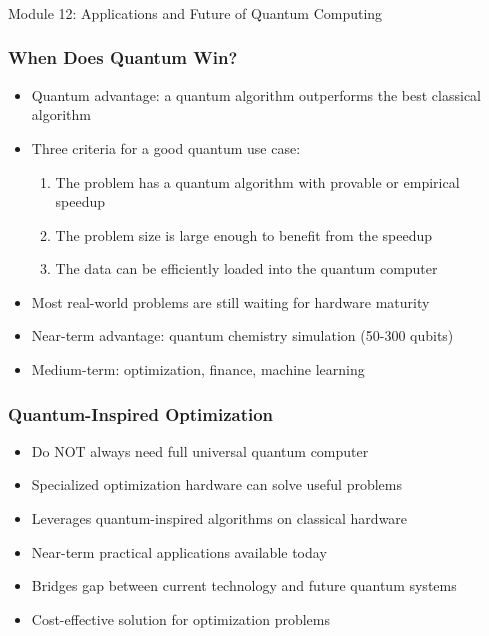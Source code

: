
\begin{frame}[fragile]\frametitle{}
\begin{center}
{\Large Module 12: Applications and Future of Quantum Computing}
\end{center}
\end{frame}

\begin{frame}[fragile]\frametitle{When Does Quantum Win?}
\begin{itemize}
\item Quantum advantage: a quantum algorithm outperforms the best classical algorithm
\item Three criteria for a good quantum use case:
  \begin{enumerate}
  \item The problem has a quantum algorithm with provable or empirical speedup
  \item The problem size is large enough to benefit from the speedup
  \item The data can be efficiently loaded into the quantum computer
  \end{enumerate}
\item Most real-world problems are still waiting for hardware maturity
\item Near-term advantage: quantum chemistry simulation (50-300 qubits)
\item Medium-term: optimization, finance, machine learning
\end{itemize}
\end{frame}

\begin{frame}[fragile]\frametitle{Quantum-Inspired Optimization}
\begin{itemize}
\item Do NOT always need full universal quantum computer
\item Specialized optimization hardware can solve useful problems
\item Leverages quantum-inspired algorithms on classical hardware
\item Near-term practical applications available today
\item Bridges gap between current technology and future quantum systems
\item Cost-effective solution for optimization problems
\end{itemize}
\end{frame}

